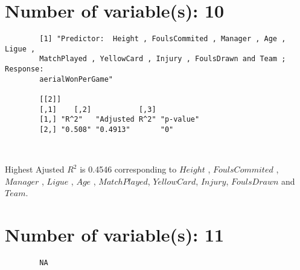\documentclass[12pt]{article}
\begin{document}
	\section{Number of variable(s): 10}
	\begin{verbatim}
		[1] "Predictor:  Height , FoulsCommited , Manager , Age , Ligue , 
		MatchPlayed , YellowCard , Injury , FoulsDrawn and Team ; Response:  
		aerialWonPerGame"
		
		[[2]]
		[,1]    [,2]           [,3]     
		[1,] "R^2"   "Adjusted R^2" "p-value"
		[2,] "0.508" "0.4913"       "0"      
		
		
	\end{verbatim}
	Highest Ajusted $ R^2 $ is 0.4546 corresponding to $Height$ , $FoulsCommited$ , $Manager$ , $Ligue$ , $Age$ , 
	$ MatchPlayed $, $ YellowCard $, $ Injury $, $ FoulsDrawn $ and $ Team $.
	
	\section{Number of variable(s): 11}
	\begin{verbatim}
		NA
	\end{verbatim}
	
\end{document}
